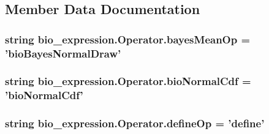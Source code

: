 \subsection{Member Data Documentation}
\hypertarget{classbio__expression_1_1_operator_a482c5c114fe61acfb6d94d8de4fe73ab}{
\subsubsection[{bayes\+Mean\+Op}]{\setlength{\rightskip}{0pt plus 5cm}string bio\+\_\+expression.\+Operator.\+bayes\+Mean\+Op = '{\bf bio\+Bayes\+Normal\+Draw}'\hspace{0.3cm}{\ttfamily [static]}}}\label{classbio__expression_1_1_operator_a482c5c114fe61acfb6d94d8de4fe73ab}
\hypertarget{classbio__expression_1_1_operator_a7e1eb8e6000edd55e5e9db7f4fb2c65b}{
\subsubsection[{bio\+Normal\+Cdf}]{\setlength{\rightskip}{0pt plus 5cm}string bio\+\_\+expression.\+Operator.\+bio\+Normal\+Cdf = '{\bf bio\+Normal\+Cdf}'\hspace{0.3cm}{\ttfamily [static]}}}\label{classbio__expression_1_1_operator_a7e1eb8e6000edd55e5e9db7f4fb2c65b}
\hypertarget{classbio__expression_1_1_operator_a697c8f61e4d58a600f19d613e98ba9a8}{
\subsubsection[{define\+Op}]{\setlength{\rightskip}{0pt plus 5cm}string bio\+\_\+expression.\+Operator.\+define\+Op = 'define'\hspace{0.3cm}{\ttfamily [static]}}}\label{classbio__expression_1_1_operator_a697c8f61e4d58a600f19d613e98ba9a8}
